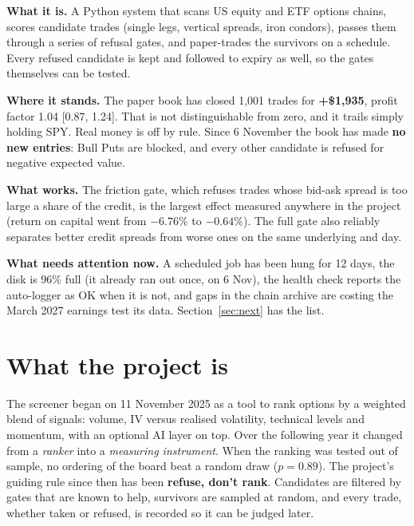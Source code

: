 \documentclass[11pt,a4paper]{article}
\begin{document}
\setcounter{tocdepth}{1}
\tableofcontents
\vspace{1em}

\begin{keybox}[title=Executive summary]
\textbf{What it is.} A Python system that scans US equity and ETF options chains,
scores candidate trades (single legs, vertical spreads, iron condors), passes
them through a series of refusal gates, and paper-trades the survivors on a
schedule. Every refused candidate is kept and followed to expiry as well, so the
gates themselves can be tested.

\textbf{Where it stands.} The paper book has closed 1,001 trades for
\textbf{+\$1,935}, profit factor 1.04 [0.87, 1.24]. That is not distinguishable from zero,
and it trails simply holding SPY. Real money is off by rule. Since 6 November the
book has made \textbf{no new entries}: Bull Puts are blocked, and every other candidate is
refused for negative expected value.

\textbf{What works.} The friction gate, which refuses trades whose bid-ask spread is
too large a share of the credit, is the largest effect measured anywhere in the
project (return on capital went from $-6.76\%$ to $-0.64\%$). The full gate also
reliably separates better credit spreads from worse ones on the same underlying and day.

\textbf{What needs attention now.} A scheduled job has been hung for 12 days, the
disk is 96\% full (it already ran out once, on 6 Nov), the health check reports the
auto-logger as OK when it is not, and gaps in the chain archive are costing the
March 2027 earnings test its data. Section~\ref{sec:next} has the list.
\end{keybox}

\newpage
\section{What the project is}

The screener began on 11 November 2025 as a tool to rank options by a weighted
blend of signals: volume, IV versus realised volatility, technical levels and
momentum, with an optional AI layer on top. Over the following year it changed
from a \emph{ranker} into a \emph{measuring instrument}. When the ranking was tested
out of sample, no ordering of the board beat a random draw ($p = 0.89$).
The project's guiding rule since then has been \textbf{refuse, don't rank}.
Candidates are filtered by gates that are known to help, survivors are sampled at
random, and every trade, whether taken or refused, is recorded so it can be judged later.
\end{document}
